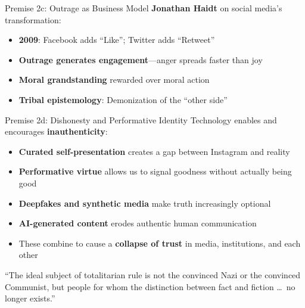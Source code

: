 ﻿\documentclass[aspectratio=169,11pt]{beamer}
\begin{document}
\begin{frame}{Premise 2c: Outrage as Business Model}
\textbf{Jonathan Haidt} on social media's transformation:

\begin{itemize}
    \item \textbf{2009}: Facebook adds ``Like''; Twitter adds ``Retweet''
    \item \textbf{Outrage generates engagement}---anger spreads faster than joy
    \item \textbf{Moral grandstanding} rewarded over moral action
    \item \textbf{Tribal epistemology}: Demonization of the ``other side''
\end{itemize}

\begin{center}
\end{center}
\end{frame}

\begin{frame}{Premise 2d: Dishonesty and Performative Identity}
Technology enables and encourages \textbf{inauthenticity}:

\begin{itemize}
    \item \textbf{Curated self-presentation} creates a gap between Instagram and reality
    \item \textbf{Performative virtue} allows us to signal goodness without actually being good
    \item \textbf{Deepfakes and synthetic media} make truth increasingly optional
    \item \textbf{AI-generated content} erodes authentic human communication
    \item These combine to cause a \textbf{collapse of trust} in media, institutions, and each other
\end{itemize}

\vspace{0.3cm}
\begin{quotebox}
``The ideal subject of totalitarian rule is not the convinced Nazi or the convinced Communist, but people for whom the distinction between fact and fiction \ldots\ no longer exists.''
\end{quotebox}
\end{frame}
\end{document}
